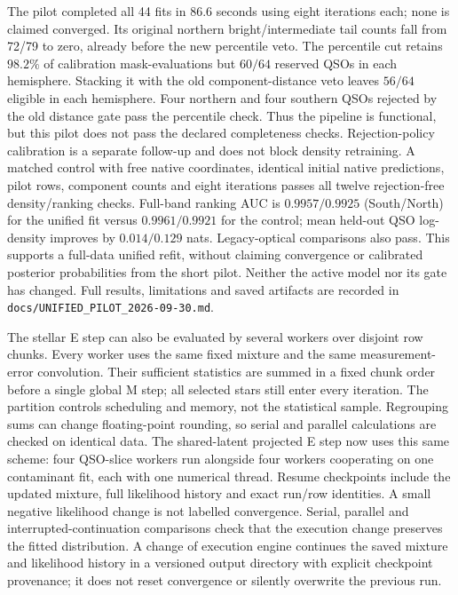 \documentclass[11pt,a4paper]{article}
\begin{document}
The pilot completed all 44 fits in $86.6$ seconds using eight iterations each;
none is claimed converged. Its original northern bright/intermediate tail
counts fall from 72/79 to zero, already before the new percentile veto. The
percentile cut retains $98.2\%$ of calibration mask-evaluations but $60/64$
reserved QSOs in each hemisphere. Stacking it with the old component-distance
veto leaves $56/64$ eligible in each hemisphere. Four northern and four southern
QSOs rejected by the old distance gate pass the percentile check. Thus the
pipeline is functional, but this pilot does not pass the declared completeness
checks. Rejection-policy calibration is a separate follow-up and does not
block density retraining. A matched control with free native coordinates,
identical initial native predictions, pilot rows, component counts and eight
iterations passes all twelve rejection-free density/ranking checks. Full-band
ranking AUC is $0.9957/0.9925$ (South/North) for the unified fit versus
$0.9961/0.9921$ for the control; mean held-out QSO log-density improves by
$0.014/0.129$ nats. Legacy-optical comparisons also pass. This supports a
full-data unified refit, without claiming convergence or calibrated posterior
probabilities from the short pilot. Neither the active model nor its gate has
changed. Full results, limitations and saved artifacts are recorded in
\texttt{docs/UNIFIED\_PILOT\_2026-09-30.md}.

The stellar E step can also be evaluated by several workers over disjoint row
chunks. Every worker uses the same fixed mixture and the same measurement-error
convolution. Their sufficient statistics are summed in a fixed chunk order
before a single global M step; all selected stars still enter every iteration.
The partition controls scheduling and memory, not the statistical sample.
Regrouping sums can change floating-point rounding, so serial and parallel
calculations are checked on identical data. The shared-latent projected E step
now uses this same scheme: four QSO-slice workers run alongside four workers
cooperating on one contaminant fit, each with one numerical thread. Resume
checkpoints include the updated mixture, full likelihood history and exact
run/row identities. A small negative likelihood change is not labelled
convergence. Serial, parallel and interrupted-continuation comparisons check
that the execution change preserves the fitted distribution. A change of execution engine
continues the saved mixture and likelihood history in a versioned output
directory with explicit checkpoint provenance; it does not reset convergence
or silently overwrite the previous run.
\end{document}
